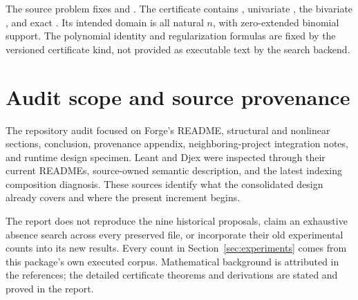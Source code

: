 The source problem fixes  and .
The certificate contains , univariate , the
bivariate , and exact . Its intended domain
is all natural $n$, with zero-extended binomial support. The polynomial identity
and regularization formulas are fixed by the versioned certificate kind, not
provided as executable text by the search backend.

\section{Audit scope and source provenance}

The repository audit focused on Forge's README, structural and nonlinear
sections, conclusion, provenance appendix, neighboring-project integration
notes, and runtime design specimen. Leant and Djex were inspected through their
current READMEs, source-owned semantic description, and the latest indexing
composition diagnosis. These sources identify what the consolidated design
already covers and where the present increment begins.

The report does not reproduce the nine historical proposals, claim an
exhaustive absence search across every preserved file, or incorporate their
old experimental counts into its new results. Every count in
Section~\ref{sec:experiments} comes from this package's own executed corpus.
Mathematical background is attributed in the references; the detailed
certificate theorems and derivations are stated and proved in the report.
